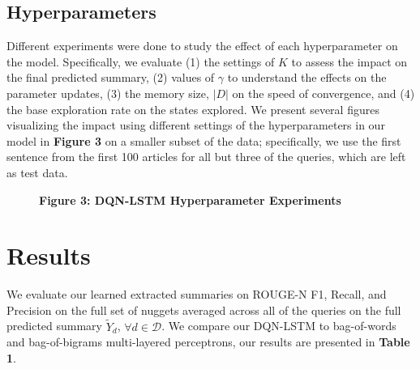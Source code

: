 \documentclass[12pt]{article}
\begin{document}
\subsection{Hyperparameters}
Different experiments were done to study the effect of each hyperparameter on the model.  Specifically, we evaluate (1) the settings of $K$ to assess the impact on the final predicted summary, (2) values of $\gamma$ to understand the effects on the parameter updates, (3) the memory size, $ | D |$ on the speed of convergence, and (4) the base exploration rate on the states explored. We present several figures visualizing the impact using different settings of the hyperparameters in our model in \textbf{Figure 3} on a smaller subset of the data; specifically, we use the first sentence from the first 100 articles for all but three of the queries, which are left as test data. 

\begin{figure}[h]
    \centering
    \captionsetup{labelformat=empty}
    \caption{\textbf{Figure 3: DQN-LSTM Hyperparameter Experiments}}
\end{figure}

\section{Results}
We evaluate our learned extracted summaries on ROUGE-N F1, Recall, and Precision on the full set of nuggets averaged across all of the queries on the full predicted summary $\tilde{Y}_d$, $\forall d \in \mathcal{D}$. We compare our DQN-LSTM to bag-of-words and bag-of-bigrams multi-layered perceptrons, our results are presented in \textbf{Table 1}.
\end{document}
